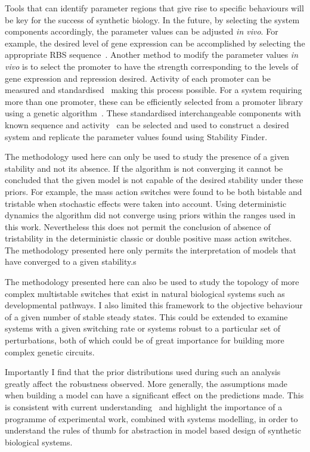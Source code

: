  Tools that can identify parameter regions that give rise to specific behaviours will be key for the success of synthetic biology. In the future, by selecting the system components accordingly, the parameter values can be adjusted \textit{in vivo}. For example, the desired level of gene expression can be accomplished by selecting the appropriate RBS sequence~\autocite{Salis:2009gk}. Another method to modify the parameter values \textit{in vivo} is to select the promoter to have the strength corresponding to the levels of gene expression and repression desired. Activity of each promoter can be measured and standardised~\autocite{Kelly:2009bj} making this process possible. For a system requiring more than one promoter, these can be efficiently selected from a promoter library using a genetic algorithm~\autocite{Wu:2011bq}. These standardised interchangeable components with known sequence and activity~\autocite{Kelly:2009bj,Canton:2008fv} can be selected and used to construct a desired system and replicate the parameter values found using Stability Finder.

The methodology used here can only be used to study the presence of a given stability and not its absence. If the algorithm is not converging it cannot be concluded that the given model is not capable of the desired stability under these priors. For example, the mass action switches were found to be both bistable and tristable when stochastic effects were taken into account. Using deterministic dynamics the algorithm did not converge using priors within the ranges used in this work. Nevertheless this does not permit the conclusion of absence of tristability in the deterministic classic or double positive mass action switches. The methodology presented here only permits the interpretation of models that have converged to a given stability.s

The methodology presented here can also be used to study the topology of more complex multistable switches that exist in natural biological systems such as developmental pathways. I also limited this framework to the objective behaviour of a given number of stable steady states. This could be extended to examine systems with a given switching rate or systems robust to a particular set of perturbations, both of which could be of great importance for building more complex genetic circuits.

Importantly I find that the prior distributions used during such an analysis greatly affect the robustness observed. More generally, the assumptions made when building a model can have a significant effect on the predictions made. This is consistent with current understanding~\autocite{Babtie:2014jg} and highlight the importance of a programme of experimental work, combined with systems modelling, in order to understand the rules of thumb for abstraction in model based design of synthetic biological systems.

